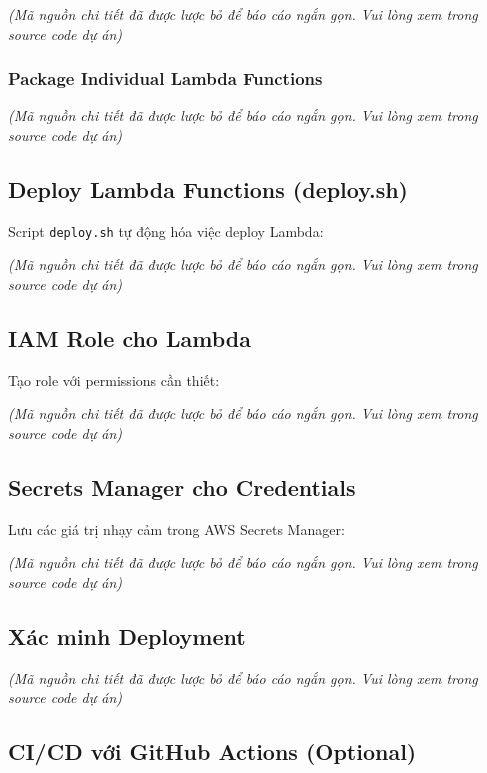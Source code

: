 \emph{(Mã nguồn chi tiết đã được lược bỏ để báo cáo ngắn gọn. Vui lòng
xem trong source code dự án)}

\hypertarget{package-individual-lambda-functions}{%
\subsubsection{Package Individual Lambda
Functions}}

\emph{(Mã nguồn chi tiết đã được lược bỏ để báo cáo ngắn gọn. Vui lòng
xem trong source code dự án)}

\hypertarget{deploy-lambda-functions-deploy.sh}{%
\subsection{Deploy Lambda Functions
(deploy.sh)}}

Script \texttt{deploy.sh} tự động hóa việc deploy Lambda:

\emph{(Mã nguồn chi tiết đã được lược bỏ để báo cáo ngắn gọn. Vui lòng
xem trong source code dự án)}

\hypertarget{iam-role-cho-lambda}{%
\subsection{IAM Role cho Lambda}}

Tạo role với permissions cần thiết:

\emph{(Mã nguồn chi tiết đã được lược bỏ để báo cáo ngắn gọn. Vui lòng
xem trong source code dự án)}

\hypertarget{secrets-manager-cho-credentials}{%
\subsection{Secrets Manager cho
Credentials}}

Lưu các giá trị nhạy cảm trong AWS Secrets Manager:

\emph{(Mã nguồn chi tiết đã được lược bỏ để báo cáo ngắn gọn. Vui lòng
xem trong source code dự án)}

\hypertarget{xuxe1c-minh-deployment}{%
\subsection{Xác minh Deployment}}

\emph{(Mã nguồn chi tiết đã được lược bỏ để báo cáo ngắn gọn. Vui lòng
xem trong source code dự án)}

\hypertarget{cicd-vux1edbi-github-actions-optional}{%
\subsection{CI/CD với GitHub Actions
(Optional)}}

